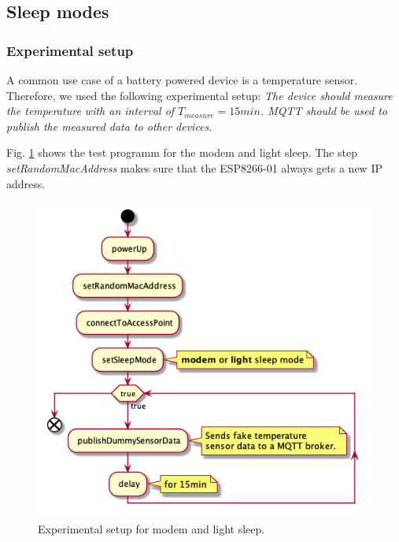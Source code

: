 \subsection{Sleep modes}

\subsubsection{Experimental setup}
A common use case of a battery powered device is a temperature sensor.
Therefore, we used the following experimental setup:
\textit{The device should measure the temperature with an interval of $T_{measure} = 15min$.
MQTT should be used to publish the measured data to other devices.}

Fig. \ref{fig:experiment_modem_light_sleep} shows the test programm for the modem and light sleep.
The step \textit{setRandomMacAddress} makes sure that the ESP8266-01 always gets a new IP address.

\begin{figure}[H]
    \centering
    \includegraphics[width = 0.7 \linewidth]{fig/sequence_modem_light_sleep.png}
    \caption{Experimental setup for modem and light sleep.}
    \label{fig:experiment_modem_light_sleep}
\end{figure}

